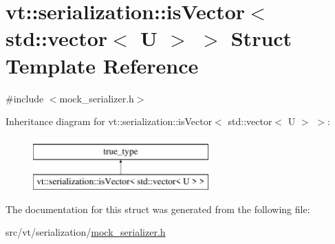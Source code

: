 \hypertarget{structvt_1_1serialization_1_1is_vector_3_01std_1_1vector_3_01_u_01_4_01_4}{}\section{vt\+:\+:serialization\+:\+:is\+Vector$<$ std\+:\+:vector$<$ U $>$ $>$ Struct Template Reference}
\label{structvt_1_1serialization_1_1is_vector_3_01std_1_1vector_3_01_u_01_4_01_4}


{\ttfamily \#include $<$mock\+\_\+serializer.\+h$>$}

Inheritance diagram for vt\+:\+:serialization\+:\+:is\+Vector$<$ std\+:\+:vector$<$ U $>$ $>$\+:\begin{figure}[H]
\begin{center}
\leavevmode
\includegraphics[height=2.000000cm]{structvt_1_1serialization_1_1is_vector_3_01std_1_1vector_3_01_u_01_4_01_4}
\end{center}
\end{figure}


The documentation for this struct was generated from the following file\+:\begin{DoxyCompactItemize}
\item 
src/vt/serialization/\hyperlink{mock__serializer_8h}{mock\+\_\+serializer.\+h}\end{DoxyCompactItemize}
